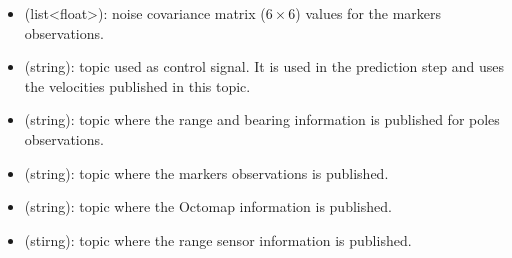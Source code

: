 \begin{itemize}
{\begin{itemize}
            \item{ (list<float>): noise covariance matrix ($6\times 6$) values for the markers observations.}
            \item{ (string): topic used as control signal. It is used in the prediction step and uses the velocities published in this topic.}
            \item{ (string): topic where the range and bearing information is published for poles observations.}
            \item{ (string): topic where the markers observations is published.}
            \item{ (string): topic where the Octomap information is published.}
            \item{ (stirng): topic where the range sensor information is published.}
        \end{itemize}
    }
\end{itemize}
